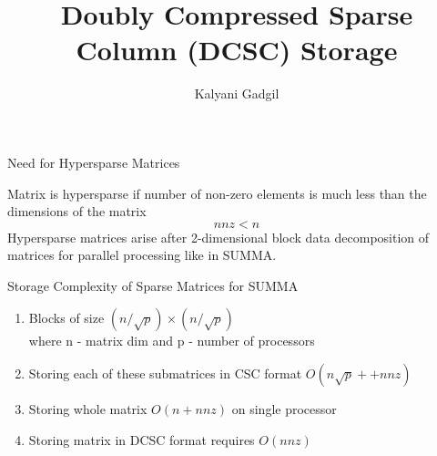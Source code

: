 \documentclass[12pt, usenames, dvipsnames, table]{beamer}
\author{Kalyani Gadgil}
\title{Doubly Compressed Sparse Column (DCSC) Storage }
\begin{document}
\newcommand{\highlight}[1]{%
  \colorbox{red!50}{$\displaystyle#1$}}
  
\newcommand{\hls}[2]{%
  \colorbox{yellow!50}{$\displaystyle#2$}}

\newcommand\hlgreen[1]{\tikz[overlay, remember picture,baseline=-\the\dimexpr\fontdimen22\textfont2\relax]\node[rectangle,fill=YellowOrange!100,rounded corners,fill opacity = 0.2,draw,thick,text opacity =1] {$#1$};} 

\newcommand\hlblue[1]{\tikz[overlay, remember picture,baseline=-\the\dimexpr\fontdimen22\textfont2\relax]\node[rectangle,fill=blue!20,rounded corners,fill opacity = 0.2,draw,thick,text opacity =1] {$#1$};} 

\newcommand\hlorange[1]{\tikz[overlay, remember picture,baseline=-\the\dimexpr\fontdimen22\textfont2\relax]\node[rectangle,fill=YellowGreen!100,rounded corners,fill opacity = 0.2,draw,thick,text opacity =1] {$#1$};}

\newcommand\hlpink[1]{\tikz[overlay, remember picture,baseline=-\the\dimexpr\fontdimen22\textfont2\relax]\node[rectangle,fill=Magenta!100,rounded corners,fill opacity = 0.2,draw,thick,text opacity =1] {$#1$};} 

\newcommand{\tikzmark}[2]{\tikz[overlay, remember picture] \node[inner sep=0pt, outer sep=0pt, anchor=base] (#1) {#2};}

 
\begin{frame}
\titlepage
\end{frame}

\begin{frame}{Need for Hypersparse Matrices}
	\begin{center}
		Matrix is hypersparse if number of non-zero elements is much less than the dimensions of the matrix $$ nnz < n $$
		Hypersparse matrices arise after 2-dimensional block data decomposition of matrices for parallel processing like in SUMMA. \\
	\end{center}
\end{frame}

\begin{frame}{Storage Complexity of Sparse Matrices for SUMMA}
	\begin{enumerate}
	\item Blocks of size $(n/\sqrt{p})\times (n/\sqrt{p})$ \\ where n - matrix dim and p - number of processors
	\item Storing each of these submatrices in CSC format $O(n\sqrt{p} ++ nnz)$
	\item Storing whole matrix $O(n + nnz)$ on single processor
	\item Storing matrix in DCSC format requires $O(nnz)$
\end{enumerate}		

\end{frame}
\end{document}
